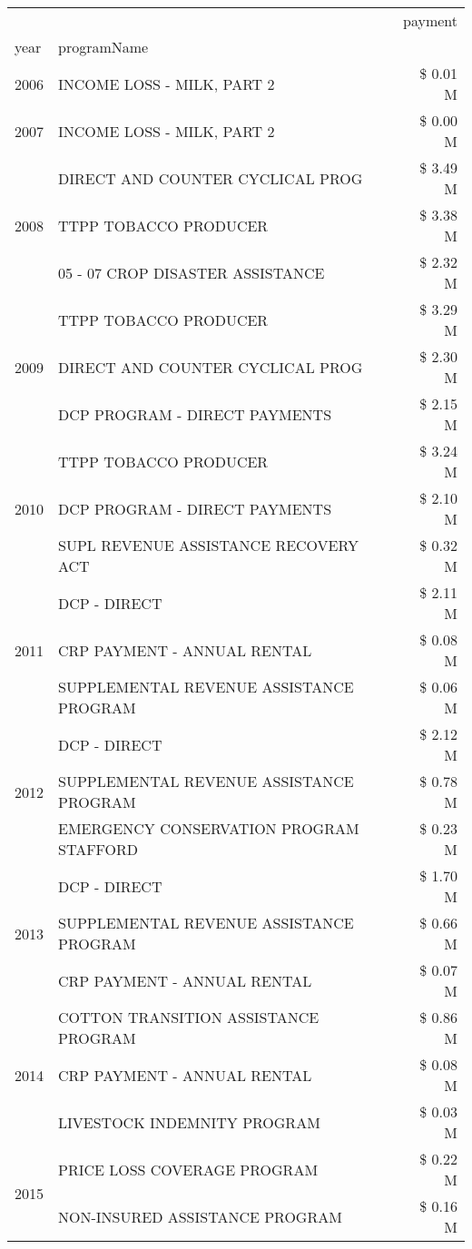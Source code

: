\begin{tabular}{llr}
\toprule
 &  & payment \\
year & programName &  \\
\midrule
2006 & INCOME LOSS - MILK, PART 2 & \$ 0.01 M \\
\cline{1-3}
2007 & INCOME LOSS - MILK, PART 2 & \$ 0.00 M \\
\cline{1-3}
\multirow[t]{3}{*}{2008} & DIRECT AND COUNTER CYCLICAL PROG & \$ 3.49 M \\
 & TTPP TOBACCO PRODUCER & \$ 3.38 M \\
 & 05 - 07 CROP DISASTER ASSISTANCE & \$ 2.32 M \\
\cline{1-3}
\multirow[t]{3}{*}{2009} & TTPP TOBACCO PRODUCER & \$ 3.29 M \\
 & DIRECT AND COUNTER CYCLICAL PROG & \$ 2.30 M \\
 & DCP PROGRAM - DIRECT PAYMENTS & \$ 2.15 M \\
\cline{1-3}
\multirow[t]{3}{*}{2010} & TTPP TOBACCO PRODUCER & \$ 3.24 M \\
 & DCP PROGRAM - DIRECT PAYMENTS & \$ 2.10 M \\
 & SUPL REVENUE ASSISTANCE RECOVERY ACT & \$ 0.32 M \\
\cline{1-3}
\multirow[t]{3}{*}{2011} & DCP - DIRECT & \$ 2.11 M \\
 & CRP PAYMENT - ANNUAL RENTAL & \$ 0.08 M \\
 & SUPPLEMENTAL REVENUE ASSISTANCE PROGRAM & \$ 0.06 M \\
\cline{1-3}
\multirow[t]{3}{*}{2012} & DCP - DIRECT & \$ 2.12 M \\
 & SUPPLEMENTAL REVENUE ASSISTANCE PROGRAM & \$ 0.78 M \\
 & EMERGENCY CONSERVATION PROGRAM STAFFORD & \$ 0.23 M \\
\cline{1-3}
\multirow[t]{3}{*}{2013} & DCP - DIRECT & \$ 1.70 M \\
 & SUPPLEMENTAL REVENUE ASSISTANCE PROGRAM & \$ 0.66 M \\
 & CRP PAYMENT - ANNUAL RENTAL & \$ 0.07 M \\
\cline{1-3}
\multirow[t]{3}{*}{2014} & COTTON TRANSITION ASSISTANCE PROGRAM & \$ 0.86 M \\
 & CRP PAYMENT - ANNUAL RENTAL & \$ 0.08 M \\
 & LIVESTOCK INDEMNITY PROGRAM & \$ 0.03 M \\
\cline{1-3}
\multirow[t]{3}{*}{2015} & PRICE LOSS COVERAGE PROGRAM & \$ 0.22 M \\
 & NON-INSURED ASSISTANCE PROGRAM & \$ 0.16 M \\

\end{tabular}
